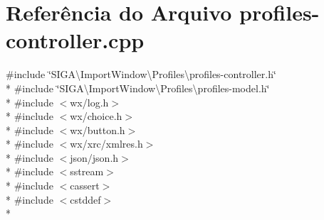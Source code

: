 \section{Referência do Arquivo profiles-\/controller.cpp}
\label{profiles-controller_8cpp}
{\ttfamily \#include \char`\"{}S\+I\+G\+A\textbackslash{}\+Import\+Window\textbackslash{}\+Profiles\textbackslash{}profiles-\/controller.\+h\char`\"{}}\\*
{\ttfamily \#include \char`\"{}S\+I\+G\+A\textbackslash{}\+Import\+Window\textbackslash{}\+Profiles\textbackslash{}profiles-\/model.\+h\char`\"{}}\\*
{\ttfamily \#include $<$wx/log.\+h$>$}\\*
{\ttfamily \#include $<$wx/choice.\+h$>$}\\*
{\ttfamily \#include $<$wx/button.\+h$>$}\\*
{\ttfamily \#include $<$wx/xrc/xmlres.\+h$>$}\\*
{\ttfamily \#include $<$json/json.\+h$>$}\\*
{\ttfamily \#include $<$sstream$>$}\\*
{\ttfamily \#include $<$cassert$>$}\\*
{\ttfamily \#include $<$cstddef$>$}\\*
